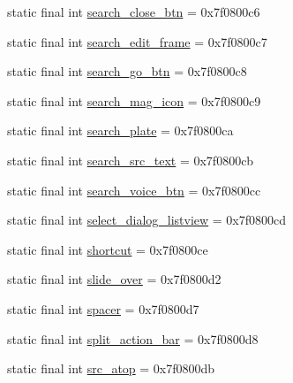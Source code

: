 \begin{DoxyCompactItemize}
\item 
static final int \mbox{\hyperlink{classcom_1_1synnapps_1_1carouselview_1_1_r_1_1id_a8ea96ef77ad32c7224638240ce82da51}{search\+\_\+close\+\_\+btn}} = 0x7f0800c6
\item 
static final int \mbox{\hyperlink{classcom_1_1synnapps_1_1carouselview_1_1_r_1_1id_ac141245f10b7290f9a7dd44296a287c5}{search\+\_\+edit\+\_\+frame}} = 0x7f0800c7
\item 
static final int \mbox{\hyperlink{classcom_1_1synnapps_1_1carouselview_1_1_r_1_1id_a1214104b2484a0a386f32c51dc1513c5}{search\+\_\+go\+\_\+btn}} = 0x7f0800c8
\item 
static final int \mbox{\hyperlink{classcom_1_1synnapps_1_1carouselview_1_1_r_1_1id_ac7dc150e5503560ff532e4514e33a03c}{search\+\_\+mag\+\_\+icon}} = 0x7f0800c9
\item 
static final int \mbox{\hyperlink{classcom_1_1synnapps_1_1carouselview_1_1_r_1_1id_ab03952081dd78417ab1dc63b99c3f1f2}{search\+\_\+plate}} = 0x7f0800ca
\item 
static final int \mbox{\hyperlink{classcom_1_1synnapps_1_1carouselview_1_1_r_1_1id_a48e79475bb93707b2410c7ddae8a64cb}{search\+\_\+src\+\_\+text}} = 0x7f0800cb
\item 
static final int \mbox{\hyperlink{classcom_1_1synnapps_1_1carouselview_1_1_r_1_1id_abcc285c6dd4e8ddfb299d9d40f3d212a}{search\+\_\+voice\+\_\+btn}} = 0x7f0800cc
\item 
static final int \mbox{\hyperlink{classcom_1_1synnapps_1_1carouselview_1_1_r_1_1id_afd356f9714ce56227961675c04eabc74}{select\+\_\+dialog\+\_\+listview}} = 0x7f0800cd
\item 
static final int \mbox{\hyperlink{classcom_1_1synnapps_1_1carouselview_1_1_r_1_1id_a3d16af11bfb453562e296a46801f3a23}{shortcut}} = 0x7f0800ce
\item 
static final int \mbox{\hyperlink{classcom_1_1synnapps_1_1carouselview_1_1_r_1_1id_ae4e46d521546d20024b037d7bee1f9ad}{slide\+\_\+over}} = 0x7f0800d2
\item 
static final int \mbox{\hyperlink{classcom_1_1synnapps_1_1carouselview_1_1_r_1_1id_a7a7d1348164655b1e8b3fb531b4891c3}{spacer}} = 0x7f0800d7
\item 
static final int \mbox{\hyperlink{classcom_1_1synnapps_1_1carouselview_1_1_r_1_1id_aa725c406aa13581b7d66bc518605a112}{split\+\_\+action\+\_\+bar}} = 0x7f0800d8
\item 
static final int \mbox{\hyperlink{classcom_1_1synnapps_1_1carouselview_1_1_r_1_1id_a2d1c08a9a65967fb0bedcea2362c9972}{src\+\_\+atop}} = 0x7f0800db

\end{DoxyCompactItemize}
